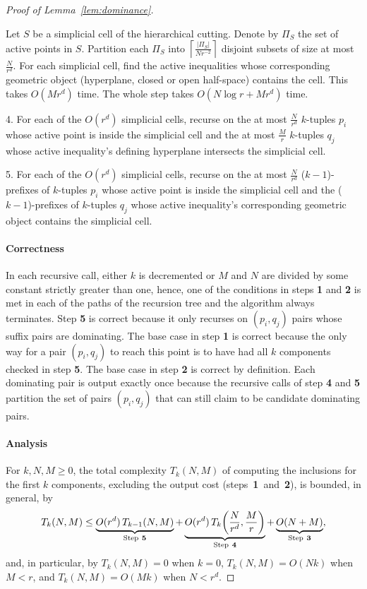 \begin{proof}[Proof of Lemma~\ref{lem:dominance}]
\begin{algorithm}
Let $S$ be a simplicial cell of the hierarchical cutting.
Denote by $\Pi_S$ the set of active points in $S$. Partition each $\Pi_S$ into
$\left\lceil \frac{\lvert \Pi_S \rvert}{N r^{-2}} \right\rceil$ disjoint subsets
of size at most $\frac{N}{r^d}$.
%
For each simplicial cell, find the active inequalities whose corresponding
geometric object (hyperplane, closed or open half-space) contains the cell.
This takes $O(Mr^d)$ time.
%
The whole step takes $O(N\log r+Mr^d)$ time.
\item[4.] For each of the $O(r^d)$ simplicial cells, recurse on the at most
	$\frac{N}{r^d}$ $k$-tuples $p_i$ whose active point is inside the
	simplicial cell and the at most $\frac{M}{r}$ $k$-tuples $q_j$ whose active
	inequality's defining hyperplane intersects the simplicial cell.
\item[5.] For each of the $O(r^d)$ simplicial cells, recurse on the at most
	$\frac{N}{r^d}$ ($k-1$)-prefixes of $k$-tuples $p_i$ whose active point is
	inside the simplicial cell and the ($k-1$)-prefixes of $k$-tuples $q_j$
	whose active inequality's corresponding geometric object contains the simplicial cell.
\end{algorithm}

\paragraph{Correctness}
In each recursive call, either $k$ is decremented or $M$ and $N$ are divided by
some constant strictly greater than one, hence, one of the conditions in steps \textbf{1} and \textbf{2} is
met in each of the paths of the recursion tree and the algorithm always terminates.
Step \textbf{5} is correct because it only recurses on $(p_i,q_j)$ pairs whose
suffix pairs are dominating.
The base case in step \textbf{1} is correct because the only way for a pair
$(p_i,q_j)$ to reach this point is to have had all $k$ components checked in
step \textbf{5}.
The base case in step \textbf{2} is correct by definition.
Each dominating pair is output exactly once because the recursive calls of
step \textbf{4} and \textbf{5} partition the set of pairs $(p_i,q_j)$ that can
still claim to be candidate dominating pairs.

\paragraph{Analysis} For $k,N,M\ge0$, the total complexity $T_k(N,M)$ of
computing the inclusions for the first $k$ components, excluding the output
cost (steps~\textbf{1}~and~\textbf{2}), is bounded, in general, by
\begin{displaymath}
	T_k(N,M)
	\le
	\underbrace{O(r^d)\,T_{k-1}(N,M)}_{\text{Step}~\textbf{5}}
	+
	\underbrace{O(r^d)\,T_k\mleft(\frac{N}{r^d},\frac{M}{r}\mright)}_{\text{Step}~\textbf{4}}
	+
	\underbrace{O(N+M)}_{\text{Step}~\textbf{3}},
\end{displaymath}
and, in particular, by
\(T_k(N,M) = 0\) when \(k=0\),
\(T_k(N,M) = O(Nk)\) when \(M < r\), and
\(T_k(N,M) = O(Mk)\) when \(N < r^d\).


\end{proof}
